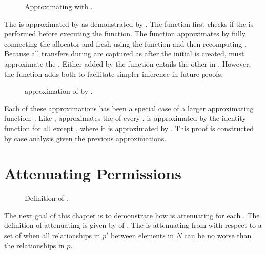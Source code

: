 \begin{figure}
  \COQDOCinsert{}
  \COQDOCendow{}
  \COQDOCendowDep{}
  \COQDOCpotAccMCreate{}
  \caption{Approximating \COQcreateDepAG{} with \COQendowDep{}.\label{fig:safety:potAccMCreate}}
\end{figure}

The \TMcreate{} \TMop{} is approximated by \COQendowDep{} as demonstrated by .
The \COQendowDep{} function first checks if the \TMallocate{} \TMop{} is performed before executing the \COQendow{} function.
The \COQendow{} function approximates \TMallocate{} by fully connecting the allocator and fresh \TMobjs{} using the \COQinsert{} function and then recomputing \TMpotAcc{}.
Because all \TMcap{} transfers during \TMallocate{} are captured as \TMpotTransfers{} after the initial \TMcap{} is created, \COQendowDep{} must approximate the \TMcreate{} \TMop{}.
Either \TMcap{} added by the \COQinsert{} function entails the other in \TMpotAcc{}.
However, the \COQinsert{} function adds both \TMcaps{} to facilitate simpler inference in future proofs.

\begin{figure}
  \COQDOCpotAccOp{}
  \COQDOCpotAccMDirAccOp{}
  \caption{\xmakefirstuc{\TMpotAcc} approximation of \COQdirAccOp{} by \COQpotAccOp{}.}
\end{figure}

Each of these approximations has been a special case of a larger approximating function: \COQpotAccOp{}.
Like \COQdirAccOp{}, \COQpotAccOp{} approximates the \TMpotAcc{} of every \TMop{}.
\xmakefirstuc{\TMpotAcc{}} is approximated by the identity function for all \TMops{} except \TMcreate{}, where it is approximated by \COQendowDep{}.
This proof is constructed by case analysis given the previous approximations.

\section{Attenuating Permissions}

\begin{figure}
  \COQDOCagReduce{}
  \caption{Definition of \COQagReduce{}. \label{fig:safety:agReduce}}
\end{figure}

The next goal of this chapter is to demonstrate how \TMpotAcc{} is attenuating for each \TMop{}.
The definition of attenuating is given by \COQagReduce{} of .
The \TMaccessGraph{}  is attenuating from  with respect to a set of \TMobjs{}  when all relationships in \(p'\) between elements in \(N\) can be no worse than the relationships in \(p\).


